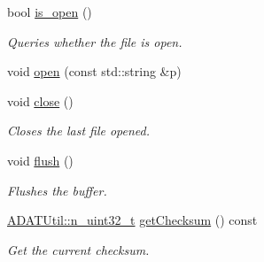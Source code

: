 \begin{DoxyCompactItemize}
\item 
bool \mbox{\hyperlink{classADATIO_1_1BinaryFileWriter_a891f81b41b18e3ba86c7e8af134b603e}{is\+\_\+open}} ()
\begin{DoxyCompactList}\small\item\em Queries whether the file is open. \end{DoxyCompactList}\item 
void \mbox{\hyperlink{classADATIO_1_1BinaryFileWriter_a943ba19816b403b36f50f72740ea856a}{open}} (const std\+::string \&p)
\item 
void \mbox{\hyperlink{classADATIO_1_1BinaryFileWriter_a20a1bdb753aaf28e60de49e80ddf953d}{close}} ()
\begin{DoxyCompactList}\small\item\em Closes the last file opened. \end{DoxyCompactList}\item 
void \mbox{\hyperlink{classADATIO_1_1BinaryFileWriter_ad914b901c6386a2ad7b2c8cf9bddfa9b}{flush}} ()
\begin{DoxyCompactList}\small\item\em Flushes the buffer. \end{DoxyCompactList}\item 
\mbox{\hyperlink{namespaceADATUtil_ad945a8afa4db2d1f89b731964adae97e}{A\+D\+A\+T\+Util\+::n\+\_\+uint32\+\_\+t}} \mbox{\hyperlink{classADATIO_1_1BinaryFileWriter_ad6f9d995a02d4b3e8e12ad18972d58a5}{get\+Checksum}} () const
\begin{DoxyCompactList}\small\item\em Get the current checksum. \end{DoxyCompactList}\end{DoxyCompactItemize}
